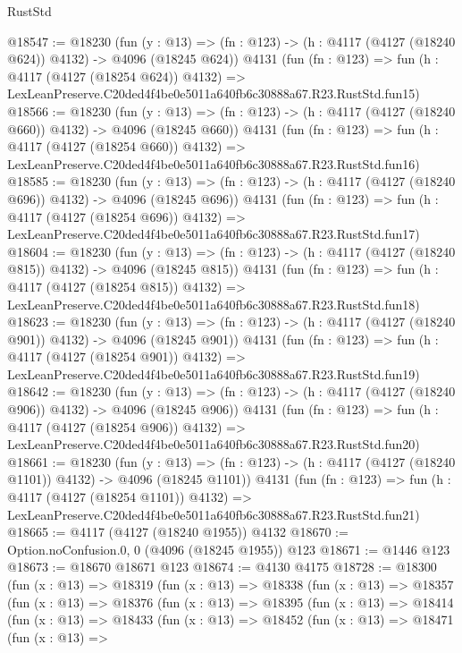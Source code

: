 \begin{lexlean}{RustStd}
\begin{coremodule}
@18547 := @18230
    (fun (y : @13) => (fn : @123) -> (h : @4117 (@4127 (@18240 @624)) @4132) -> @4096 (@18245 @624))
    @4131
    (fun (fn : @123) =>
    fun (h : @4117 (@4127 (@18254 @624)) @4132) =>
    LexLeanPreserve.C20ded4f4be0e5011a640fb6c30888a67.R23.RustStd.fun15)
@18566 := @18230
    (fun (y : @13) => (fn : @123) -> (h : @4117 (@4127 (@18240 @660)) @4132) -> @4096 (@18245 @660))
    @4131
    (fun (fn : @123) =>
    fun (h : @4117 (@4127 (@18254 @660)) @4132) =>
    LexLeanPreserve.C20ded4f4be0e5011a640fb6c30888a67.R23.RustStd.fun16)
@18585 := @18230
    (fun (y : @13) => (fn : @123) -> (h : @4117 (@4127 (@18240 @696)) @4132) -> @4096 (@18245 @696))
    @4131
    (fun (fn : @123) =>
    fun (h : @4117 (@4127 (@18254 @696)) @4132) =>
    LexLeanPreserve.C20ded4f4be0e5011a640fb6c30888a67.R23.RustStd.fun17)
@18604 := @18230
    (fun (y : @13) => (fn : @123) -> (h : @4117 (@4127 (@18240 @815)) @4132) -> @4096 (@18245 @815))
    @4131
    (fun (fn : @123) =>
    fun (h : @4117 (@4127 (@18254 @815)) @4132) =>
    LexLeanPreserve.C20ded4f4be0e5011a640fb6c30888a67.R23.RustStd.fun18)
@18623 := @18230
    (fun (y : @13) => (fn : @123) -> (h : @4117 (@4127 (@18240 @901)) @4132) -> @4096 (@18245 @901))
    @4131
    (fun (fn : @123) =>
    fun (h : @4117 (@4127 (@18254 @901)) @4132) =>
    LexLeanPreserve.C20ded4f4be0e5011a640fb6c30888a67.R23.RustStd.fun19)
@18642 := @18230
    (fun (y : @13) => (fn : @123) -> (h : @4117 (@4127 (@18240 @906)) @4132) -> @4096 (@18245 @906))
    @4131
    (fun (fn : @123) =>
    fun (h : @4117 (@4127 (@18254 @906)) @4132) =>
    LexLeanPreserve.C20ded4f4be0e5011a640fb6c30888a67.R23.RustStd.fun20)
@18661 := @18230
    (fun (y : @13) =>
    (fn : @123) -> (h : @4117 (@4127 (@18240 @1101)) @4132) -> @4096 (@18245 @1101))
    @4131
    (fun (fn : @123) =>
    fun (h : @4117 (@4127 (@18254 @1101)) @4132) =>
    LexLeanPreserve.C20ded4f4be0e5011a640fb6c30888a67.R23.RustStd.fun21)
@18665 := @4117 (@4127 (@18240 @1955)) @4132
@18670 := Option.noConfusion.{0, 0} (@4096 (@18245 @1955)) @123
@18671 := @1446 @123
@18673 := @18670 @18671 @123
@18674 := @4130 @4175
@18728 := @18300
    (fun (x : @13) =>
    @18319
      (fun (x : @13) =>
      @18338
        (fun (x : @13) =>
        @18357
          (fun (x : @13) =>
          @18376
            (fun (x : @13) =>
            @18395
              (fun (x : @13) =>
              @18414
                (fun (x : @13) =>
                @18433
                  (fun (x : @13) =>
                  @18452
                    (fun (x : @13) =>
                    @18471
                      (fun (x : @13) =>

\end{coremodule}
\end{lexlean}
